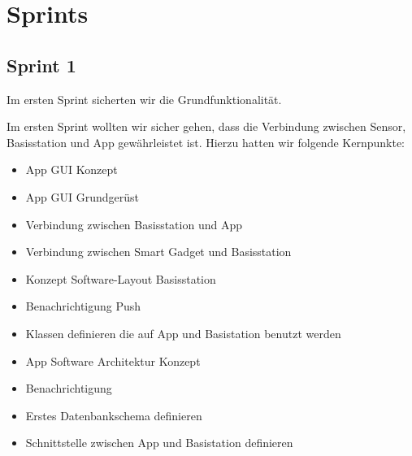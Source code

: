 \section{Sprints}


\subsection{Sprint 1}
Im ersten Sprint sicherten wir die Grundfunktionalität. 

Im ersten Sprint wollten wir sicher gehen, dass die Verbindung zwischen Sensor, Basisstation und App gewährleistet ist. Hierzu hatten wir folgende Kernpunkte:
\begin{itemize}
	\item App GUI Konzept 
	\item App GUI Grundgerüst
	\item Verbindung zwischen Basisstation und App
	\item Verbindung zwischen Smart Gadget und Basisstation
	\item Konzept Software-Layout Basisstation
	\item Benachrichtigung Push
	\item Klassen definieren die auf App und Basistation benutzt werden
	\item App Software Architektur Konzept
	\item Benachrichtigung
	\item Erstes Datenbankschema definieren
	\item Schnittstelle zwischen App und Basistation definieren
\end{itemize}

